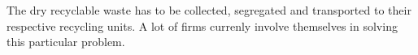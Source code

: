 \documentclass[10pt]{article}
\begin{document}
The dry recyclable waste has to be collected, segregated and transported to their respective recycling units. A lot of firms currenly involve themselves in solving this particular problem. 





\end{document}
